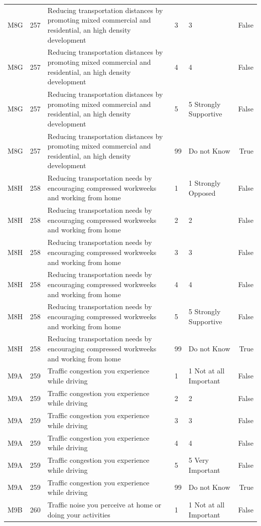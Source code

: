 \begin{tabular}{lrlllr}
M8G & 257 & Reducing transportation distances by promoting mixed commercial and residential, an high density development & 3 & 3 & False \\
M8G & 257 & Reducing transportation distances by promoting mixed commercial and residential, an high density development & 4 & 4 & False \\
M8G & 257 & Reducing transportation distances by promoting mixed commercial and residential, an high density development & 5 & 5 Strongly Supportive & False \\
M8G & 257 & Reducing transportation distances by promoting mixed commercial and residential, an high density development & 99 & Do not Know & True \\
M8H & 258 & Reducing transportation needs by encouraging compressed workweeks and working from home & 1 & 1 Strongly Opposed & False \\
M8H & 258 & Reducing transportation needs by encouraging compressed workweeks and working from home & 2 & 2 & False \\
M8H & 258 & Reducing transportation needs by encouraging compressed workweeks and working from home & 3 & 3 & False \\
M8H & 258 & Reducing transportation needs by encouraging compressed workweeks and working from home & 4 & 4 & False \\
M8H & 258 & Reducing transportation needs by encouraging compressed workweeks and working from home & 5 & 5 Strongly Supportive & False \\
M8H & 258 & Reducing transportation needs by encouraging compressed workweeks and working from home & 99 & Do not Know & True \\
M9A & 259 & Traffic congestion you experience while driving & 1 & 1 Not at all Important & False \\
M9A & 259 & Traffic congestion you experience while driving & 2 & 2 & False \\
M9A & 259 & Traffic congestion you experience while driving & 3 & 3 & False \\
M9A & 259 & Traffic congestion you experience while driving & 4 & 4 & False \\
M9A & 259 & Traffic congestion you experience while driving & 5 & 5 Very Important & False \\
M9A & 259 & Traffic congestion you experience while driving & 99 & Do not Know & True \\
M9B & 260 & Traffic noise you perceive at home or doing your activities & 1 & 1 Not at all Important & False \\

\end{tabular}
